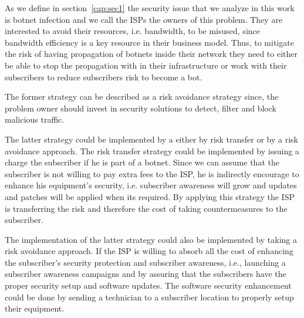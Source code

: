 
As we define in section~\ref{cap:sec1} the security issue that we analyze in this work is botnet infection and we call the ISPs the owners of this problem.
They are interested to avoid their resources, i.e. bandwidth, to be misused, since bandwidth efficiency is a key resource in their business model. Thus,  to mitigate the risk of having propagation of botnets inside their network they need to either be able to stop the propagation with in their infrastructure or work with their subscribers to reduce subscribers risk to become a bot.

The former strategy can be described as a risk avoidance strategy since, the problem owner should invest in security solutions to detect, filter and block malicious traffic. %

The latter strategy could be implemented by a either by risk transfer or by a risk avoidance approach. The risk transfer strategy could be implemented by issuing a charge the subscriber if he is part of a botnet. Since we can assume that the subscriber is not willing to pay extra fees to the ISP, he is indirectly encourage to enhance his equipment's security, i.e. subscriber awareness will grow and updates and patches will be applied when its required. By applying this strategy the ISP is transferring the risk and therefore the cost of taking countermeasures to the subscriber.

The implementation of the latter strategy could also be implemented by taking a risk avoidance approach. If the ISP is willing to absorb all the cost of enhancing the subscriber's security protection and subscriber awareness, i.e., launching a  subscriber awareness campaigns and by assuring that the subscribers have the proper security setup and software updates. The software security enhancement could be done by sending a technician to a subscriber location to properly setup their equipment.




